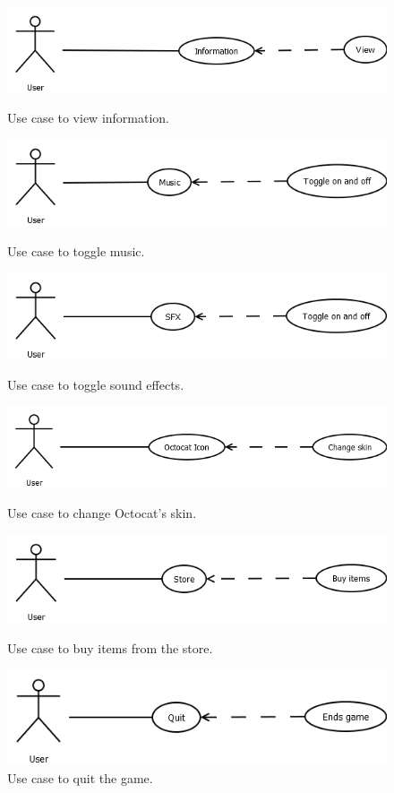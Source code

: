 \documentclass[10pt,conference,onecolumn,compsoc]{IEEEtran}
\begin{document}
\begin{figure}[h!]
\centering
\includegraphics[scale=.5]{Information.png}
\caption{Use case to view information.}
\label{Info}

\includegraphics[scale=.5]{Music.png}
\caption{Use case to toggle music.}
\label{Music}

\includegraphics[scale=.5]{SFX.png}
\caption{Use case to toggle sound effects.}
\label{SFX}

\includegraphics[scale=.5]{Octocat_Icon.png}
\caption{Use case to change Octocat's skin.}
\label{Skin}

\includegraphics[scale=.5]{Store.png}
\caption{Use case to buy items from the store.}
\label{Store}

\includegraphics[scale=.5]{Quit.png}
\caption{Use case to quit the game.}
\label{Quit}
\end{figure}
\end{document}
